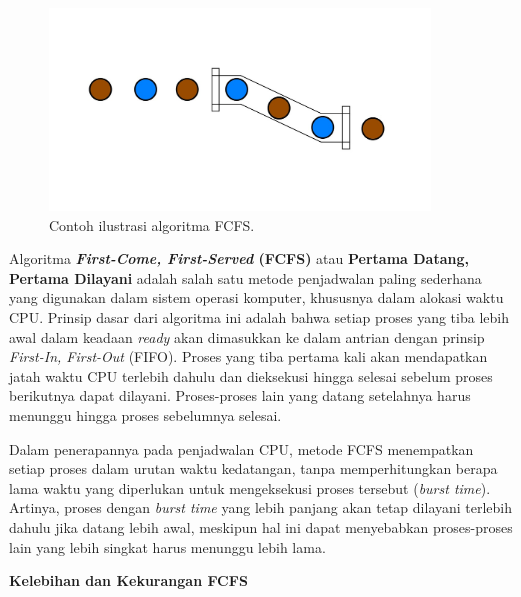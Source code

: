 \documentclass[12pt]{article}
\begin{document}
\begin{figure}[h]
    \centering
    \includegraphics[width=0.9\textwidth]{asset/fcfs-illustration.jpg}
    \caption{Contoh ilustrasi algoritma FCFS.}
    \label{fig:contoh-ilustrasi-algoritma-fcfs}
\end{figure}

\hspace{1cm}

Algoritma \textbf{\textit{First-Come, First-Served} (FCFS)} atau \textbf{Pertama Datang, Pertama Dilayani} adalah salah satu metode penjadwalan paling sederhana yang digunakan dalam sistem operasi komputer, khususnya dalam alokasi waktu CPU. Prinsip dasar dari algoritma ini adalah bahwa setiap proses yang tiba lebih awal dalam keadaan \textit{ready} akan dimasukkan ke dalam antrian dengan prinsip \textit{First-In, First-Out} (FIFO). Proses yang tiba pertama kali akan mendapatkan jatah waktu CPU terlebih dahulu dan dieksekusi hingga selesai sebelum proses berikutnya dapat dilayani. Proses-proses lain yang datang setelahnya harus menunggu hingga proses sebelumnya selesai.


\hspace{1cm}

Dalam penerapannya pada penjadwalan CPU, metode FCFS menempatkan setiap proses dalam urutan waktu kedatangan, tanpa memperhitungkan berapa lama waktu yang diperlukan untuk mengeksekusi proses tersebut (\textit{burst time}). Artinya, proses dengan \textit{burst time} yang lebih panjang akan tetap dilayani terlebih dahulu jika datang lebih awal, meskipun hal ini dapat menyebabkan proses-proses lain yang lebih singkat harus menunggu lebih lama.

\hspace{1cm}

\textbf{Kelebihan dan Kekurangan FCFS}

\hspace{1cm}
\end{document}
